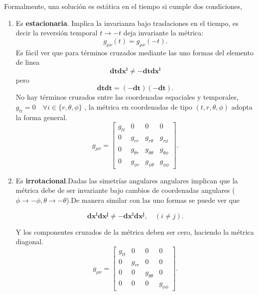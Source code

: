 Formalmente, una solución es estática en el tiempo si cumple dos condiciones,
\begin{enumerate}
    \item  Es \textbf{estacionaria}. Implica la invarianza bajo traslaciones en el tiempo, es decir la reversión temporal \( t \to -t \) deja invariante la métrica:
          \[ g_{\mu\nu}(t) = g_{\mu\nu}(-t). \]
          Es fácil ver que para términos cruzados mediante las uno formas del elemento de linea
          \begin{equation}
              \mathbf{dt}\mathbf{dx^i} \neq \mathbf{-dt}\mathbf{dx^i}
          \end{equation}
          pero
          \begin{equation}
              \mathbf{dt}\mathbf{dt} = (\mathbf{-dt})(\mathbf{-dt}) .
          \end{equation}
          No hay términos cruzados entre las coordenadas espaciales y temporales, $ g_{ti} = 0 \quad \forall i \in \{r, \theta, \phi\}$ , la métrica en coordenadas de tipo \((t, r, \theta, \phi)\) adopta la forma general.
          \begin{equation}
              g_{\mu \nu} =
              \begin{bmatrix}
                  g_{tt} & 0            & 0                & 0              \\
                  0      & g_{rr}       & g_{r\theta}      & g_{r\phi}      \\
                  0      & g_{\theta r} & g_{\theta\theta} & g_{\theta\phi} \\
                  0      & g_{\phi r}   & g_{\phi\theta}   & g_{\phi\phi}
              \end{bmatrix}.
          \end{equation}
    \item Es \textbf{irrotacional}.Dadas las simetrías angulares angulares implican que la métrica debe de ser invariante bajo cambios de coordenadas angulares ($\phi \rightarrow  - \phi, \theta \rightarrow  - \theta$).De manera similar con las uno formas se puede ver que

          \begin{equation}
              \mathbf{dx^i}\mathbf{dx^j} \neq -\mathbf{dx^i}\mathbf{dx^j}, \quad (i \neq j ) .
          \end{equation}

          Y los componentes cruzados de la métrica deben ser cero, haciendo la métrica diagonal.
          \begin{equation}
              g_{\mu \nu} =
              \begin{bmatrix}
                  g_{tt} & 0      & 0                & 0            \\
                  0      & g_{rr} & 0                & 0            \\
                  0      & 0      & g_{\theta\theta} & 0            \\
                  0      & 0      & 0                & g_{\phi\phi}
              \end{bmatrix}.
          \end{equation}
\end{enumerate}

